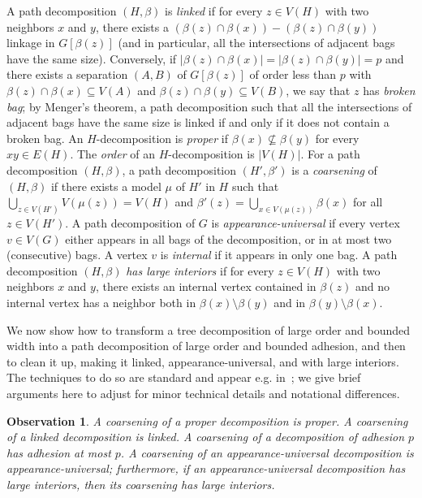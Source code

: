 \documentclass[12pt]{article}
\newtheorem{observation}[theorem]{Observation}
\begin{document}
A path decomposition $(H,\beta)$ is \emph{linked}
if for every $z\in V(H)$ with two neighbors $x$ and $y$, there exists a $(\beta(z)\cap\beta(x))-(\beta(z)\cap\beta(y))$ linkage
in $G[\beta(z)]$ (and in particular, all the intersections of adjacent bags have the same size).  Conversely, if $|\beta(z)\cap\beta(x)|=|\beta(z)\cap\beta(y)|=p$
and there exists a separation $(A,B)$ of $G[\beta(z)]$ of order less than $p$ with $\beta(z)\cap\beta(x)\subseteq V(A)$
and $\beta(z)\cap\beta(y)\subseteq V(B)$, we say that $z$ has \emph{broken bag}; by Menger's theorem, a path decomposition such that all the intersections of adjacent bags have the same size
is linked if and only if it does not contain a broken bag.  An $H$-decomposition is \emph{proper}
if $\beta(x)\not\subseteq\beta(y)$ for every $xy\in E(H)$.  The \emph{order} of an $H$-decomposition is $|V(H)|$.
For a path decomposition $(H,\beta)$, a path decomposition $(H',\beta')$ is a \emph{coarsening} of $(H,\beta)$
if there exists a model $\mu$ of $H'$ in $H$ such that $\bigcup_{z\in V(H')} V(\mu(z))=V(H)$ and $\beta'(z)=\bigcup_{x\in V(\mu(z))} \beta(x)$ for all $z\in V(H')$.
A path decomposition of $G$ is \emph{appearance-universal} if every vertex $v\in V(G)$ either appears in all bags of the decomposition,
or in at most two (consecutive) bags.  A vertex $v$ is \emph{internal} if it appears in only one bag.  A path decomposition
$(H,\beta)$ \emph{has large interiors} if for every $z\in V(H)$ with two neighbors $x$ and $y$, there exists an internal vertex
contained in $\beta(z)$
and no internal vertex has a neighbor both in $\beta(x)\setminus \beta(y)$ and in $\beta(y)\setminus\beta(x)$.


We now show how to transform a tree decomposition of large order and bounded width into a path decomposition
of large order and bounded adhesion, and then to clean it up, making it linked, appearance-universal, %
and with large interiors.
The techniques to do so are standard and appear e.g. in~\cite{kntw}; we give brief arguments here to adjust for minor technical details and
notational differences.

\begin{observation}
A coarsening of a proper decomposition is proper.  A coarsening of a linked decomposition is linked.  A coarsening of
a decomposition of adhesion $p$ has adhesion at most $p$.
A coarsening of an appearance-universal decomposition is appearance-universal; furthermore, if an appearance-universal decomposition
has large interiors, then its coarsening has large interiors.
\end{observation}
\end{document}

